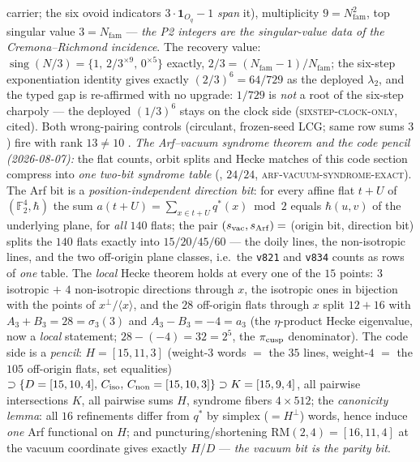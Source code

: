 \documentclass[11pt,a4paper]{article}
\newcommand{\Nfam}{N_{\mathrm{fam}}}
\theoremstyle{definition}
\begin{document}
\begin{keybox}
carrier; the six ovoid indicators $3\cdot\mathbf 1_{O_q} - 1$
\emph{span} it), multiplicity $9 = \Nfam^2$, top singular value
$3 = \Nfam$ --- \emph{the P2 integers are the singular-value
data of the Cremona--Richmond incidence}.  The recovery value:
$\operatorname{sing}(N/3) = \{1,\, 2/3^{\times9},\,
0^{\times5}\}$ exactly, $2/3 = (\Nfam - 1)/\Nfam$; the six-step
exponentiation identity gives exactly $(2/3)^6 = 64/729$ as the
deployed $\lambda_2$, and the typed gap is re-affirmed with no
upgrade: $1/729$ is \emph{not} a root of the six-step charpoly
--- the deployed $(1/3)^6$ stays on the clock side
(\textsc{sixstep-clock-only}, cited).  Both wrong-pairing
controls (circulant, frozen-seed LCG; same row sums $3$) fire
with rank $13 \ne 10$ \mE.
\emph{The Arf--vacuum syndrome theorem and the code pencil
(2026-08-07):} the flat counts, orbit splits and Hecke matches of
this code section compress into \emph{one two-bit syndrome table}
(, $24/24$,
\textsc{arf-vacuum-syndrome-exact}).  The Arf bit is a
\emph{position-independent direction bit}: for every affine flat
$t{+}U$ of $(\mathbb{F}_2^4, \hbar)$ the sum $a(t{+}U) = \sum_{x \in t+U}
q^{*}(x) \bmod 2$ equals $\hbar(u, v)$ of the underlying plane,
for \emph{all} $140$ flats; the pair $(s_{\rm vac}, s_{\rm Arf})
=$ (origin bit, direction bit) splits the $140$ flats exactly
into $15/20/45/60$ --- the doily lines, the non-isotropic lines,
and the two off-origin plane classes, i.e.\ the \texttt{v821} and
\texttt{v834} counts as rows of \emph{one} table.  The
\emph{local} Hecke theorem holds at every one of the $15$ points:
$3$ isotropic $+$ $4$ non-isotropic directions through $x$, the
isotropic ones in bijection with the points of
$x^{\perp}/\langle x\rangle$, and the $28$ off-origin flats
through $x$ split $12 + 16$ with $A_3 + B_3 = 28 = \sigma_3(3)$
and $A_3 - B_3 = -4 = a_3$ (the $\eta$-product Hecke eigenvalue,
now a \emph{local} statement; $28 - (-4) = 32 = 2^5$, the
$\pi_{\rm cusp}$ denominator).  The code side is a \emph{pencil}:
$H = [15,11,3]$ (weight-$3$ words $=$ the $35$ lines,
weight-$4$ $=$ the $105$ off-origin flats, set equalities)
$\supset \{D = [15,10,4],\, C_{\rm iso},\, C_{\rm non} =
[15,10,3]\} \supset K = [15,9,4]$, all pairwise intersections
$K$, all pairwise sums $H$, syndrome fibers $4\times512$; the
\emph{canonicity lemma}: all $16$ refinements differ from
$q^{*}$ by simplex ($= H^{\perp}$) words, hence induce \emph{one}
Arf functional on $H$; and puncturing/shortening
$\mathrm{RM}(2,4) = [16,11,4]$ at the vacuum coordinate gives
exactly $H$/$D$ --- \emph{the vacuum bit is the parity bit}.

\end{keybox}
\end{document}
